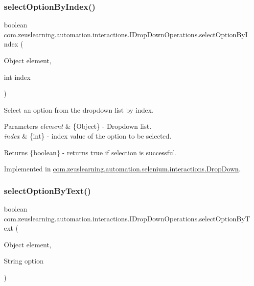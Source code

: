 \subsubsection{\texorpdfstring{select\+Option\+By\+Index()}{selectOptionByIndex()}}
{\footnotesize\ttfamily boolean com.\+zeuslearning.\+automation.\+interactions.\+I\+Drop\+Down\+Operations.\+select\+Option\+By\+Index (\begin{DoxyParamCaption}\item[{Object}]{element,  }\item[{int}]{index }\end{DoxyParamCaption})}

Select an option from the dropdown list by index.


\begin{DoxyParams}{Parameters}
{\em element} & \{Object\} -\/ Dropdown list. \\
\hline
{\em index} & \{int\} -\/ index value of the option to be selected.\\
\hline
\end{DoxyParams}
\begin{DoxyReturn}{Returns}
\{boolean\} -\/ returns {\ttfamily true} if selection is successful. 
\end{DoxyReturn}


Implemented in \hyperlink{classcom_1_1zeuslearning_1_1automation_1_1selenium_1_1interactions_1_1DropDown_a90eaa639ff1980274aa7e27a29ad7230}{com.\+zeuslearning.\+automation.\+selenium.\+interactions.\+Drop\+Down}.

\hypertarget{interfacecom_1_1zeuslearning_1_1automation_1_1interactions_1_1IDropDownOperations_acab57addaabfe48b82367a8a5a605d8e}{}\label{interfacecom_1_1zeuslearning_1_1automation_1_1interactions_1_1IDropDownOperations_acab57addaabfe48b82367a8a5a605d8e} 
\subsubsection{\texorpdfstring{select\+Option\+By\+Text()}{selectOptionByText()}}
{\footnotesize\ttfamily boolean com.\+zeuslearning.\+automation.\+interactions.\+I\+Drop\+Down\+Operations.\+select\+Option\+By\+Text (\begin{DoxyParamCaption}\item[{Object}]{element,  }\item[{String}]{option }\end{DoxyParamCaption})}

